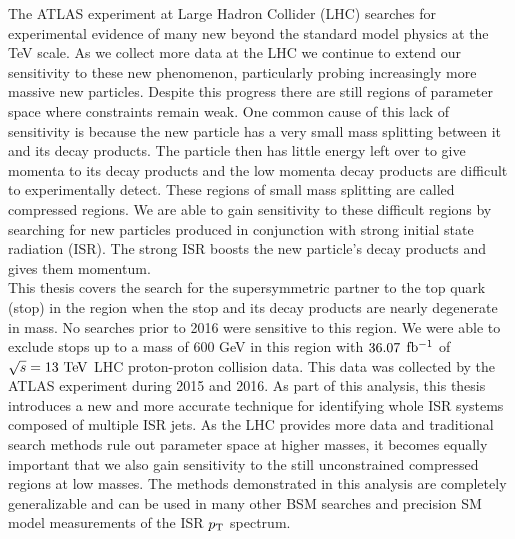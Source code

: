 
\indent The ATLAS experiment at Large Hadron Collider (LHC) searches for experimental evidence of many new beyond the standard model physics at the TeV scale.   As we collect more data at the LHC we continue to extend our sensitivity to these new phenomenon, particularly probing increasingly more massive new particles.  Despite this progress there are still regions of parameter space where constraints remain weak.   One common cause of this lack of sensitivity is because the new particle has a very small mass splitting between it and its decay products.  The particle then has little energy left over to give momenta to its decay products and the low momenta decay products are difficult to experimentally detect. These regions of small mass splitting are called compressed regions.  We are able to gain sensitivity to these difficult regions by searching for new particles produced in conjunction with strong initial state radiation (ISR).  The strong ISR boosts the new particle's decay products and gives them momentum.  \\

\indent This thesis covers the search for the supersymmetric partner to the top quark (stop) in the region when the stop and its decay products are nearly degenerate in mass.  No searches prior to 2016 were sensitive to this region.  We were able to exclude stops up to a mass of 600 GeV in this region with $36.07$ $\mbox{fb$^{-1}$}$ of $\sqrt{s} = 13 \tev$ LHC proton-proton collision data.  This data was collected by the ATLAS experiment during 2015 and 2016.  As part of this analysis, this thesis introduces a new and more accurate technique for identifying whole ISR systems composed of multiple ISR jets.   As the LHC provides more data and traditional search methods rule out parameter space at higher masses, it becomes equally important that we also gain sensitivity to the still unconstrained compressed regions at low masses.  The methods demonstrated in this analysis are completely generalizable and can be used in many other BSM searches and precision SM model measurements of the ISR $p_{\mathrm{T}}$ spectrum.